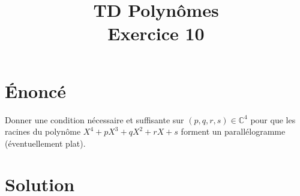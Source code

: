 \documentclass[french]{article}
\title{TD Polynômes \\ Exercice 10}
\date{}
\newcommand{\C}{\mathbb{C}}
\begin{document}
\maketitle

\section{Énoncé}
Donner une condition nécessaire et suffisante sur $(p,q,r,s)\in\C^4$ pour que les racines du polynôme $X^4+pX^3+qX^2+rX+s$ forment un parallélogramme (éventuellement plat).
\section{Solution}
\end{document}
